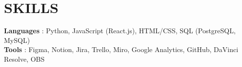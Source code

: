 \documentclass[letterpaper,11pt]{article}
\begin{document}
%
\section{SKILLS}
 \begin{itemize}[leftmargin=0in, label={}]
    \small{\item{
     \textbf{Languages} {: Python, JavaScript (React.js), HTML/CSS, SQL (PostgreSQL, MySQL)}\vspace{2pt} \\
     \textbf{Tools}     {: Figma, Notion, Jira, Trello, Miro, Google Analytics, GitHub, DaVinci Resolve, OBS}
    }}
 \end{itemize}


\end{document}
